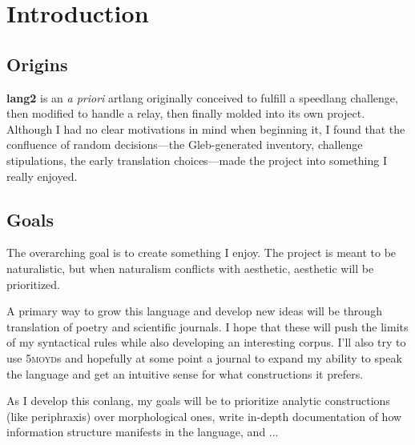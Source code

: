 \documentclass[fontsize=12pt,twoside=false,numbers=noenddot]{kaobook}
\title[A Grammar of \langname{}]{\huge \langname{}}
\subtitle{grammar of a constructed language}
\author[kilenc]{\large Seth Thompson \\ \small \textit{aka} kilenc}
\date{\small \today}
\newcommand{\langname}{\textbf{lang2}}
\newcommand{\tsc}[1]{\textsc{#1}}
\begin{document}
\frontmatter

\maketitle
{}

\setlength{\textheight}{23cm} %
\etocstandarddisplaystyle %
\etocstandardlines %
\tableofcontents 


\setchapterpreamble[u]{\margintoc}
\chapter{Introduction}
\section{Origins}
\langname{} is an \emph{a priori} artlang originally conceived to fulfill a speedlang challenge, then modified to handle a relay, then finally molded into its own project. Although I had no clear motivations in mind when beginning it, I found that the confluence of random decisions---the Gleb-generated inventory, challenge stipulations, the early translation choices---made the project into something I really enjoyed.

\section{Goals}
The overarching goal is to create something I enjoy. The project is meant to be naturalistic, but when naturalism conflicts with aesthetic, aesthetic will be prioritized.

A primary way to grow this language and develop new ideas will be through translation of poetry and scientific journals. I hope that these will push the limits of my syntactical rules while also developing an interesting corpus. I'll also try to use \tsc{5moyd}s and hopefully at some point a journal to expand my ability to speak the language and get an intuitive sense for what constructions it prefers.

As I develop this conlang, my goals will be to prioritize analytic constructions (like periphraxis) over morphological ones, write in-depth documentation of how information structure manifests in the language, and ...
\end{document}
